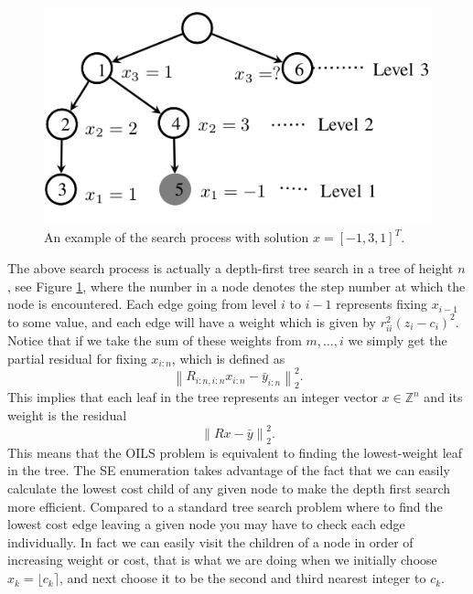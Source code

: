 \documentclass[12pt,Bold,letterpaper]{mcgilletdclass}
\begin{document}
\begin{figure}
\centering
\includegraphics[scale=0.5]{searchtree.png}
\caption{An example of the search process with solution $x = [-1,3,1]^T$.}
\label{fig:treeSearch}
\end{figure}

The above search process is actually a depth-first tree search in a tree of height $n$, see Figure \ref{fig:treeSearch},
where the number  in a node  denotes the step number at which the node is encountered. Each edge going from level $i$ to $i-1$ represents fixing $x_{i-1}$ to some value, and each edge will have a weight which is given by $r_{ii}^2(z_i -
c_i)^2$. Notice that if we take the sum of these weights from $m, \dots, i$ we simply get the partial
residual for fixing $x_{i:n}$, which is defined as $$\left \| R_{i:n,i:n}x_{i:n} -
\bar{y}_{i:n} \right \|_2^2.$$ This implies that each leaf in the tree
represents an integer vector $x \in \mathbb{Z}^n$ and its weight is the residual $$\left \|
Rx - \bar{y} \right \|_2^2.$$ This means that the OILS problem is equivalent to
finding the lowest-weight leaf in the tree. The SE enumeration takes advantage
of the fact that we can easily calculate the lowest cost child of any given
node to make the depth first search more efficient. Compared to a standard tree search problem where to find the lowest cost edge leaving a given node you may have to check each edge individually. In fact we can easily visit
the children of a node in order of increasing weight or cost, that is what we are doing when we initially choose $x_k = \lfloor c_k \rceil$, and next choose it to be the second and third nearest integer to $c_k$.
\end{document}
